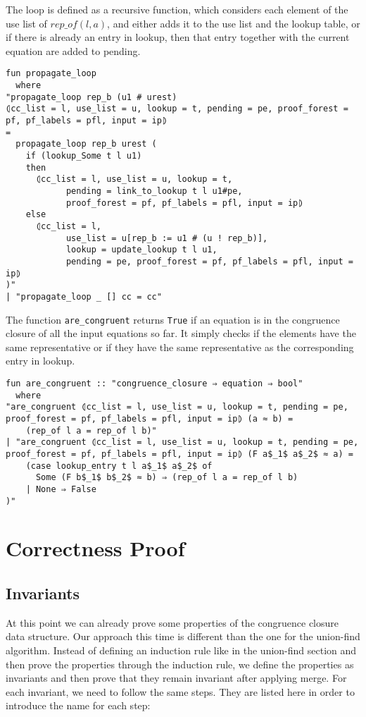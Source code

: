 The loop is defined as a recursive function, which considers each element of the use list of $rep\_of(l, a)$, and either adds it to the use list and the lookup table, or if there is already an entry in lookup, then that entry together with the current equation are added to pending.

\begin{lstlisting}
fun propagate_loop
  where
"propagate_loop rep_b (u1 # urest)
⦇cc_list = l, use_list = u, lookup = t, pending = pe, proof_forest = pf, pf_labels = pfl, input = ip⦈
=
  propagate_loop rep_b urest (
    if (lookup_Some t l u1)
    then
      ⦇cc_list = l, use_list = u, lookup = t,
            pending = link_to_lookup t l u1#pe,
            proof_forest = pf, pf_labels = pfl, input = ip⦈
    else
      ⦇cc_list = l,
            use_list = u[rep_b := u1 # (u ! rep_b)],
            lookup = update_lookup t l u1,
            pending = pe, proof_forest = pf, pf_labels = pfl, input = ip⦈
)"
| "propagate_loop _ [] cc = cc"
\end{lstlisting}

The function \lstinline{are_congruent} returns \lstinline{True} if an equation is in the congruence closure of all the input equations so far. It simply checks if the elements have the same representative or if they have the same representative as the corresponding entry in lookup.

\begin{lstlisting}
fun are_congruent :: "congruence_closure ⇒ equation ⇒ bool"
  where
"are_congruent ⦇cc_list = l, use_list = u, lookup = t, pending = pe, proof_forest = pf, pf_labels = pfl, input = ip⦈ (a ≈ b) =
    (rep_of l a = rep_of l b)"
| "are_congruent ⦇cc_list = l, use_list = u, lookup = t, pending = pe, proof_forest = pf, pf_labels = pfl, input = ip⦈ (F a$_1$ a$_2$ ≈ a) =
    (case lookup_entry t l a$_1$ a$_2$ of
      Some (F b$_1$ b$_2$ ≈ b) ⇒ (rep_of l a = rep_of l b)
    | None ⇒ False
)"
\end{lstlisting}

\section{Correctness Proof}

\subsection{Invariants}

At this point we can already prove some properties of the congruence closure data structure. Our approach this time is different than the one for the union-find algorithm. Instead of defining an induction rule like in the union-find section and then prove the properties through the induction rule, we define the properties as invariants and then prove that they remain invariant after applying merge. For each invariant, we need to follow the same steps. They are listed here in order to introduce the name for each step:

